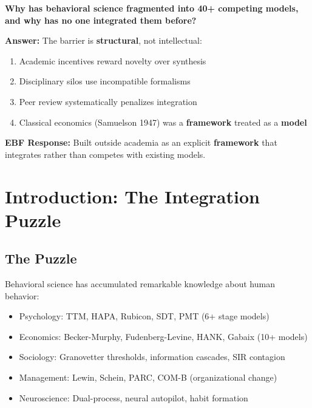 
\begin{tcolorbox}[colback=red!5!white, colframe=red!75!black,
    title=\textbf{Fundamental Question}]

\textbf{Why has behavioral science fragmented into 40+ competing models, and why
has no one integrated them before?}

\vspace{0.5em}
\textbf{Answer:} The barrier is \textbf{structural}, not intellectual:
\begin{enumerate}[nosep]
    \item Academic incentives reward novelty over synthesis
    \item Disciplinary silos use incompatible formalisms
    \item Peer review systematically penalizes integration
    \item Classical economics (Samuelson 1947) was a \textbf{framework} treated as a \textbf{model}
\end{enumerate}

\textbf{EBF Response:} Built outside academia as an explicit \textbf{framework} that integrates
rather than competes with existing models.

\end{tcolorbox}



\section{Introduction: The Integration Puzzle}
\label{sec:meta-intro}

\subsection{The Puzzle}

Behavioral science has accumulated remarkable knowledge about human behavior:
\begin{itemize}
\item Psychology: TTM, HAPA, Rubicon, SDT, PMT (6+ stage models)
\item Economics: Becker-Murphy, Fudenberg-Levine, HANK, Gabaix (10+ models)
\item Sociology: Granovetter thresholds, information cascades, SIR contagion
\item Management: Lewin, Schein, PARC, COM-B (organizational change)
\item Neuroscience: Dual-process, neural autopilot, habit formation
\end{itemize}


